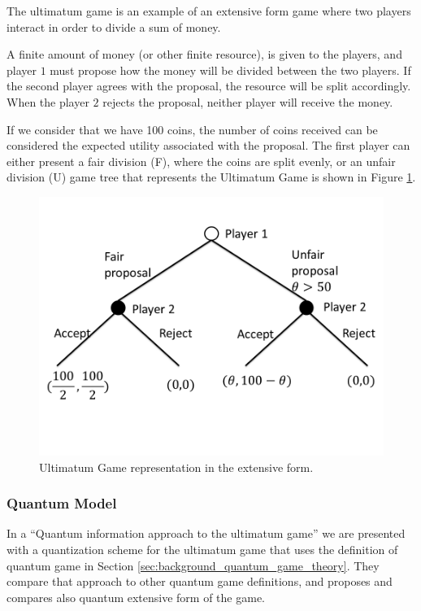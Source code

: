 The ultimatum game is an example of an extensive form game where two players interact in order to divide a sum of money.

A finite amount of money (or other finite resource), is given to the players, and player $1$ must propose how the money will be divided between the two players. If the second player agrees with the proposal, the resource will be split accordingly. When the player $2$ rejects the proposal, neither player will receive the money.

If we consider that we have 100 coins, the number of coins received can be considered the expected utility associated with the proposal. The first player can either present a fair division (F), where the coins are split evenly, or an unfair division (U) game tree that represents the Ultimatum Game is shown in Figure \ref{fig:ultimatum:gametree}.

\begin{figure}[h]
\centering 
\includegraphics[scale=0.35]{Figures/ultimatum/gametree.png}
\caption{Ultimatum Game representation in the extensive form. }
\label{fig:ultimatum:gametree}
\end{figure}

\subsubsection{Quantum Model}
\label{subsec:ultimatum}

In a ``Quantum information approach to the ultimatum game''\cite{Fra2011} we are presented with a quantization scheme for the ultimatum game that uses the definition of quantum game in Section \ref{sec:background_quantum_game_theory}. 
 They compare that approach to other quantum game definitions, and proposes and compares also quantum  extensive form of the game. 


